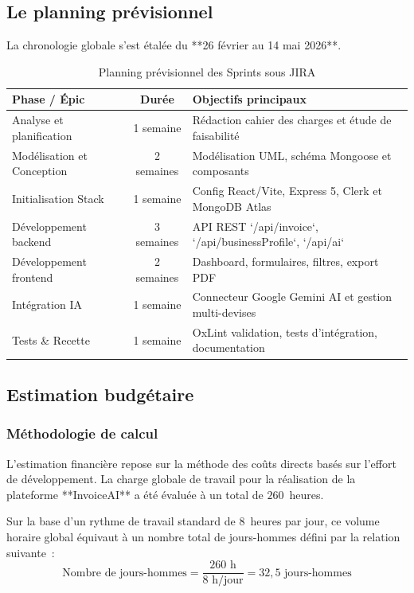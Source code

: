 \documentclass[a4paper,12pt]{extarticle}
\begin{document}
\subsection{Le planning prévisionnel}

La chronologie globale s'est étalée du **26 février au 14 mai 2026**.

\begin{table}[H]
\centering
\caption{Planning prévisionnel des Sprints sous JIRA}
\begin{tabularx}{\textwidth}{|l|c|>{\raggedright\arraybackslash}X|}
\hline
\rowcolor{igablue!15}
\textbf{Phase / Épic} & \textbf{Durée} & \textbf{Objectifs principaux} \\
\hline
Analyse et planification & 1 semaine & Rédaction cahier des charges et étude de faisabilité \\
\hline
Modélisation et Conception & 2 semaines & Modélisation UML, schéma Mongoose et composants \\
\hline
Initialisation Stack & 1 semaine & Config React/Vite, Express 5, Clerk et MongoDB Atlas \\
\hline
Développement backend & 3 semaines & API REST `/api/invoice`, `/api/businessProfile`, `/api/ai` \\
\hline
Développement frontend & 2 semaines & Dashboard, formulaires, filtres, export PDF \\
\hline
Intégration IA & 1 semaine & Connecteur Google Gemini AI et gestion multi-devises \\
\hline
Tests \& Recette & 1 semaine & OxLint validation, tests d'intégration, documentation \\
\hline
\end{tabularx}
\end{table}

\subsection{Estimation budgétaire}

\subsubsection{Méthodologie de calcul}

L'estimation financière repose sur la méthode des coûts directs basés sur l'effort de développement. La charge globale de travail pour la réalisation de la plateforme **InvoiceAI** a été évaluée à un total de $260$~heures.

Sur la base d'un rythme de travail standard de $8$~heures par jour, ce volume horaire global équivaut à un nombre total de jours-hommes défini par la relation suivante~:
$$ \text{Nombre de jours-hommes} = \frac{260\text{ h}}{8\text{ h/jour}} = 32,5\text{ jours-hommes} $$
\end{document}
